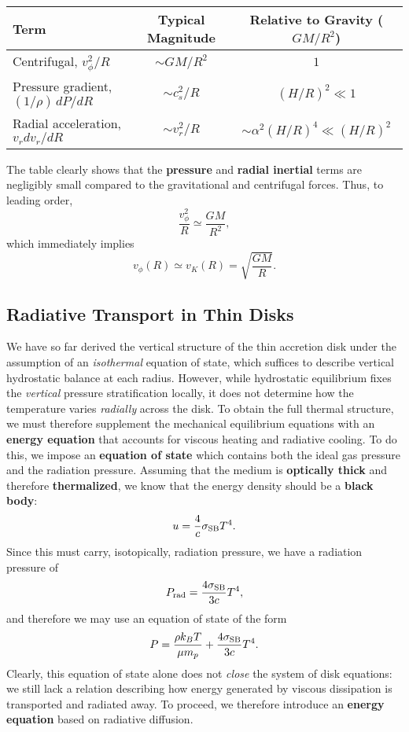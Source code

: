 \begin{center}
\renewcommand{\arraystretch}{1.4}
\begin{tabular}{lcc}
\toprule
\textbf{Term} & \textbf{Typical Magnitude} & \textbf{Relative to Gravity ($GM/R^2$)} \\
\midrule
Centrifugal, $v_\phi^2/R$ & $\sim GM/R^2$ & $1$ \\
Pressure gradient, $(1/\rho)\,dP/dR$ & $\sim c_s^2 / R$ & $(H/R)^2 \ll 1$ \\
Radial acceleration, $v_r dv_r/dR$ & $\sim v_r^2 / R$ & $\sim \alpha^2 (H/R)^4 \ll (H/R)^2$ \\
\bottomrule
\end{tabular}
\end{center}

The table clearly shows that the \textbf{pressure} and \textbf{radial inertial} terms are negligibly small compared to the gravitational and centrifugal forces. Thus, to leading order,
\begin{equation}
\frac{v_\phi^2}{R} \simeq \frac{GM}{R^2},
\end{equation}
which immediately implies
\begin{equation}
\boxed{
v_\phi(R) \simeq v_K(R) = \sqrt{\frac{GM}{R}}.
}
\end{equation}

\subsection{Radiative Transport in Thin Disks}

We have so far derived the vertical structure of the thin accretion disk under the assumption of an \emph{isothermal} equation of state, which suffices to describe vertical hydrostatic balance at each radius. However, while hydrostatic equilibrium fixes the \emph{vertical} pressure stratification locally, it does not determine how the temperature varies \emph{radially} across the disk. To obtain the full thermal structure, we must therefore supplement the mechanical equilibrium equations with an \textbf{energy equation} that accounts for viscous heating and radiative cooling. To do this, we impose an \textbf{equation of state} which contains both the ideal gas pressure and the radiation pressure. Assuming that the medium is \textbf{optically thick} and therefore \textbf{thermalized}, we know that the energy density should be a \textbf{black body}:
\[
u = \frac{4}{c} \sigma_{\rm SB} T^4.
\]
Since this must carry, isotopically, radiation pressure, we have a radiation pressure of
\[
P_{\rm rad} = \frac{4\sigma_{\rm SB}}{3c} T^4,
\]
and therefore we may use an equation of state of the form
\[
P = \frac{\rho k_B T}{\mu m_p} + \frac{4\sigma_{\rm SB}}{3c}T^4.
\]
\bigskip
\noindent
Clearly, this equation of state alone does not \emph{close} the system of disk equations: we still lack a relation describing how energy generated by viscous dissipation is transported and radiated away. To proceed, we therefore introduce an \textbf{energy equation} based on radiative diffusion.


